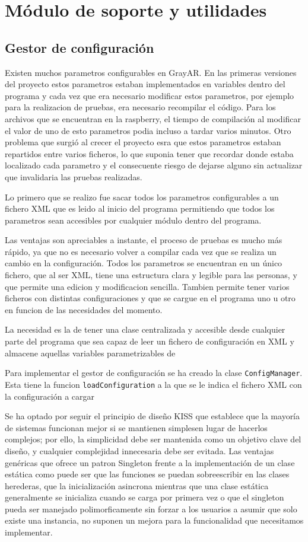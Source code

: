 \section{Módulo de soporte y utilidades}
\subsection{Gestor de configuración}
Existen muchos parametros configurables en GrayAR. En las primeras versiones del proyecto estos parametros estaban implementados en variables dentro del programa y cada vez que era necesario modificar estos parametros, por ejemplo para la realizacion de pruebas, era necesario recompilar el código. Para los archivos que se encuentran en la raspberry, el tiempo de compilación al modificar el valor de uno de esto parametros podia incluso a tardar varios minutos. Otro problema que surgió al crecer el proyecto esra que estos parametros estaban repartidos entre varios ficheros, lo que suponia tener que recordar donde estaba localizado cada parametro y el consecuente riesgo de dejarse alguno sin actualizar que invalidaria las pruebas realizadas.

Lo primero que se realizo fue sacar todos los parametros configurables a un fichero \acs{XML} que es leido al inicio del programa permitiendo que todos los parametros sean accesibles por cualquier módulo dentro del programa.

Las ventajas son apreciables a instante, el proceso de pruebas es mucho más rápido, ya que no es necesario volver a compilar cada vez que se realiza un cambio en la configuración. Todos los parametros se encuentran en un único fichero, que al ser \acs{XML}, tiene una estructura clara y legible para las personas, y que permite una edicion y modificacion sencilla. Tambien permite tener varios ficheros con distintas configuraciones y que se cargue en el programa uno u otro en funcion de las necesidades del momento.
 
La necesidad es la de tener una clase centralizada y accesible desde cualquier parte del programa que sea capaz de leer un fichero de configuración en \acs{XML} y almacene aquellas variables parametrizables de

Para implementar el gestor de configuración se ha creado la clase  \texttt{ConfigManager}. Esta tiene la funcion  \texttt{loadConfiguration} a la que se le indica el fichero \acs{XML} con la configuración a cargar 

Se ha optado por seguir el principio de diseño \acs{KISS} que establece que la mayoría de sistemas funcionan mejor si se mantienen simplesen lugar de hacerlos complejos; por ello, la simplicidad debe ser mantenida como un objetivo clave del diseño, y cualquier complejidad innecesaria debe ser evitada. Las ventajas genéricas que ofrece un patron Singleton frente a la implementación de un clase estática como puede ser que las funciones se puedan sobreescribir en las clases herederas, que la inicialización asincrona mientras que una clase estática generalmente se inicializa cuando se carga por primera vez o que el singleton pueda ser manejado polimorficamente sin forzar a los usuarios a asumir que solo existe una instancia, no suponen un mejora para la funcionalidad que necesitamos implementar. 


